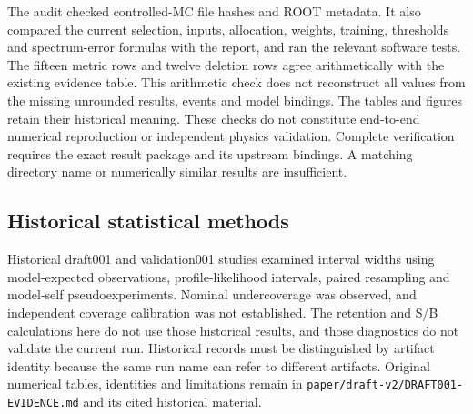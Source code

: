 \documentclass[11pt,a4paper]{article}
\begin{document}
The audit checked controlled-MC file hashes and ROOT metadata. It also compared the current selection, inputs, allocation, weights, training, thresholds and spectrum-error formulas with the report, and ran the relevant software tests.
The fifteen metric rows and twelve deletion rows agree arithmetically with the existing evidence table.
This arithmetic check does not reconstruct all values from the missing unrounded results, events and model bindings.
The tables and figures retain their historical meaning. These checks do not constitute end-to-end numerical reproduction or independent physics validation.
Complete verification requires the exact result package and its upstream bindings. A matching directory name or numerically similar results are insufficient.

\subsection{Historical statistical methods}\label{app:interval}
Historical draft001 and validation001 studies examined interval widths using model-expected observations, profile-likelihood intervals, paired resampling and model-self pseudoexperiments.
Nominal undercoverage was observed, and independent coverage calibration was not established.
The retention and S/B calculations here do not use those historical results, and those diagnostics do not validate the current run.
Historical records must be distinguished by artifact identity because the same run name can refer to different artifacts.
Original numerical tables, identities and limitations remain in \nolinkurl{paper/draft-v2/DRAFT001-EVIDENCE.md} and its cited historical material.
\end{document}
